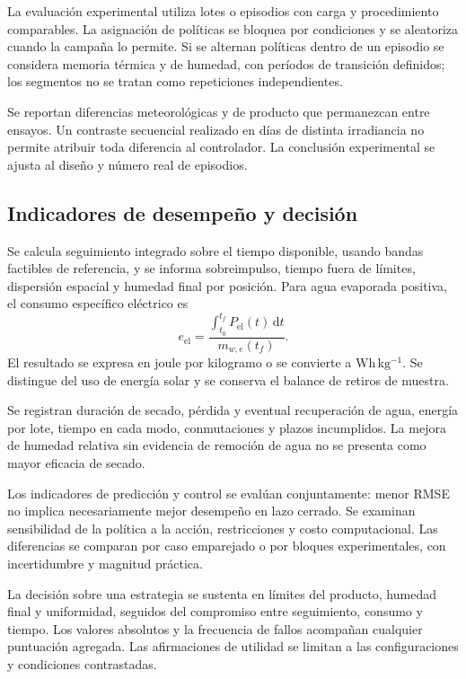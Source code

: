 La evaluación experimental utiliza lotes o episodios con carga y procedimiento comparables. La asignación de políticas se bloquea por condiciones y se aleatoriza cuando la campaña lo permite. Si se alternan políticas dentro de un episodio se considera memoria térmica y de humedad, con períodos de transición definidos; los segmentos no se tratan como repeticiones independientes.

Se reportan diferencias meteorológicas y de producto que permanezcan entre ensayos. Un contraste secuencial realizado en días de distinta irradiancia no permite atribuir toda diferencia al controlador. La conclusión experimental se ajusta al diseño y número real de episodios.

\subsection{Indicadores de desempeño y decisión}

Se calcula seguimiento integrado sobre el tiempo disponible, usando bandas factibles de referencia, y se informa sobreimpulso, tiempo fuera de límites, dispersión espacial y humedad final por posición. Para agua evaporada positiva, el consumo específico eléctrico es
\begin{equation}
e_{\mathrm{el}}=
\frac{\int_{t_0}^{t_f}P_{\mathrm{el}}(t)\,\mathrm dt}
{m_{w,e}(t_f)}.
\label{met:energia_especifica}
\end{equation}
El resultado se expresa en joule por kilogramo o se convierte a $\mathrm{Wh\,kg^{-1}}$. Se distingue del uso de energía solar y se conserva el balance de retiros de muestra.

Se registran duración de secado, pérdida y eventual recuperación de agua, energía por lote, tiempo en cada modo, conmutaciones y plazos incumplidos. La mejora de humedad relativa sin evidencia de remoción de agua no se presenta como mayor eficacia de secado.

Los indicadores de predicción y control se evalúan conjuntamente: menor RMSE no implica necesariamente mejor desempeño en lazo cerrado. Se examinan sensibilidad de la política a la acción, restricciones y costo computacional. Las diferencias se comparan por caso emparejado o por bloques experimentales, con incertidumbre y magnitud práctica.

La decisión sobre una estrategia se sustenta en límites del producto, humedad final y uniformidad, seguidos del compromiso entre seguimiento, consumo y tiempo. Los valores absolutos y la frecuencia de fallos acompañan cualquier puntuación agregada. Las afirmaciones de utilidad se limitan a las configuraciones y condiciones contrastadas.

